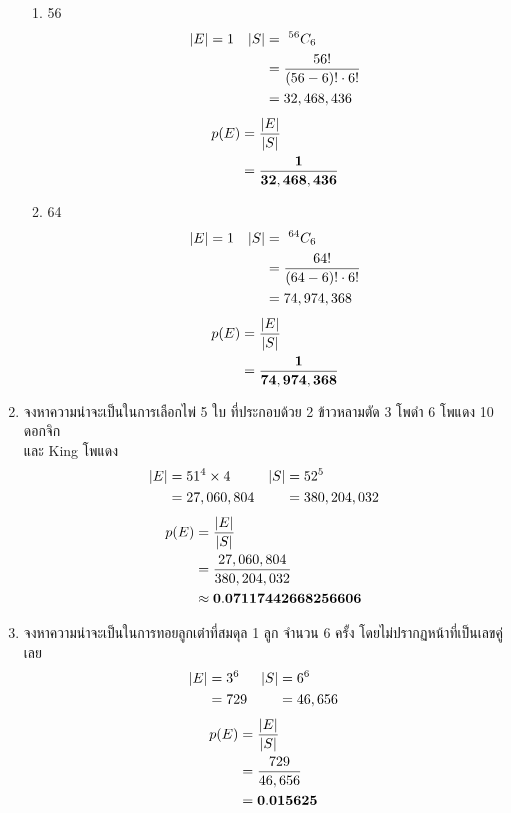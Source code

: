 \documentclass{article}
\begin{document}
\begin{enumerate}
\begin{enumerate}
	\item{56}
	\begin{align*}
	|E| &= 1 & |S| &= ~^{56}C_6 \notag \\
	&& &= \frac{56!}{(56 - 6)! \cdot 6!} \\
	&& &= 32,468,436 \\
	\end{align*}
	\begin{equation}
	\begin{split}
	p(E) &= \frac{|E|}{|S|} \notag \\
	&= \mathbf{\frac{1}{32,468,436}}
	\end{split}
	\end{equation}
	
	\item{64}
	\begin{align*}
	|E| &= 1 & |S| &= ~^{64}C_6 \notag \\
	&& &= \frac{64!}{(64 - 6)! \cdot 6!} \\
	&& &= 74,974,368
	\end{align*}
	\begin{equation}
	\begin{split}
	p(E) &= \frac{|E|}{|S|} \notag \\
	&= \mathbf{\frac{1}{74,974,368}}
	\end{split}
	\end{equation}
	
	\end{enumerate}
	
\item{จงหาความน่าจะเป็นในการเลือกไพ่ 5 ใบ ที่ประกอบด้วย 2 ข้าวหลามตัด 3 โพดำ 6 โพแดง 10 ดอกจิก \\
และ King โพแดง}
\begin{align*}
|E| &= 51^4 \times 4 & |S| &= 52^5 \notag \\
&= 27,060,804 & &= 380,204,032
\end{align*}
\begin{equation}
\begin{split}
p(E) &= \frac{|E|}{|S|} \notag \\
&= \frac{27,060,804}{380,204,032} \\
&\approx \mathbf{0.07117442668256606}
\end{split}
\end{equation}

\item{จงหาความน่าจะเป็นในการทอยลูกเต๋าที่สมดุล 1 ลูก จำนวน 6 ครั้ง โดยไม่ปรากฏหน้าที่เป็นเลขคู่เลย}
\begin{align*}
|E| &= 3^6 & |S| &= 6^6 \notag \\
&= 729 & &= 46,656
\end{align*}
\begin{equation}
\begin{split}
p(E) &= \frac{|E|}{|S|} \notag \\
&= \frac{729}{46,656} \\
&= \mathbf{0.015625}
\end{split}
\end{equation}


\end{enumerate}
\end{document}
